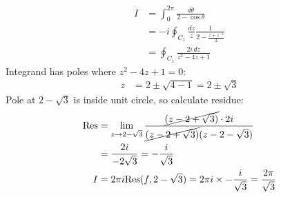 \documentclass[a4paper, 11pt, normalem]{report}
\begin{document}
\begin{example}
    \begin{align}
        I &= \int_0^{2\pi} \frac{d\theta}{2 - \cos\theta} \\
          &= -i \oint_{C_1} \frac{dz}{z} \frac{1}{2 - \frac{z + z^{-1}}{2}} \\
          &= \oint_{C_1} \frac{2i\,dz}{z^2 - 4z + 1}
    \end{align}
    Integrand has poles where $z^2 - 4z + 1 = 0$:
    \begin{align}
        z &= 2 \pm \sqrt{4 - 1} = 2\pm \sqrt{3}
    \end{align}
    Pole at $2 -\sqrt{3}$ is inside unit circle, so calculate residue:
    \begin{align}
    \text{Res} &= \lim_{z\to 2-\sqrt{3}} \frac{\cancel{(z - 2+\sqrt{3})}\cdot 2i}{\cancel{(z-2+\sqrt{3})}(z-2-\sqrt{3})} \\
               &= \frac{2i}{-2\sqrt{3}} = -\frac{i}{\sqrt{3}} \\
    I &= 2\pi i \text{Res}(f,2-\sqrt{3}) = 2\pi i \times -\frac{i}{\sqrt{3}} = \frac{2\pi}{\sqrt{3}}
    \end{align}
\end{example}
\end{document}
